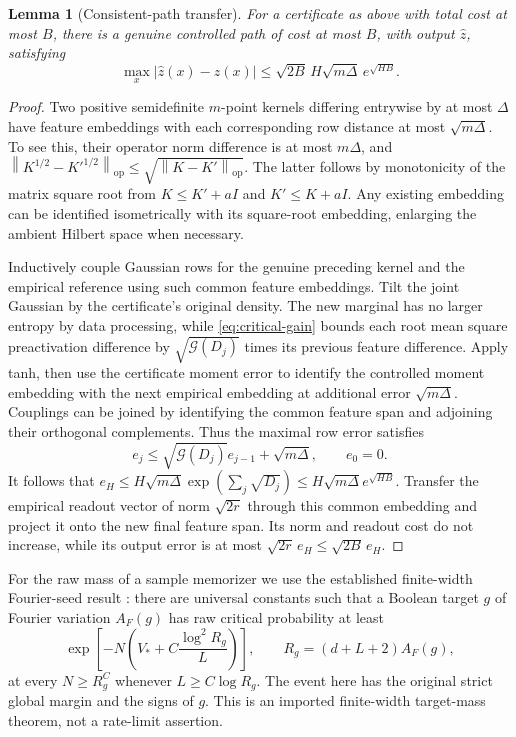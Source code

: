 \documentclass[11pt]{article}
\newtheorem{lemma}[theorem]{Lemma}
\theoremstyle{remark}
\newcommand{\Gain}{\mathcal G}
\newcommand{\norm}[1]{\left\lVert #1\right\rVert}
\begin{document}
\begin{lemma}[Consistent-path transfer]
\label{lem:critical-consistent-transfer}
For a certificate as above with total cost at most $B$, there is
a genuine controlled path of cost at most $B$, with output
$\widehat z$, satisfying
\[
 \max_x|\widehat z(x)-z(x)|
 \le \sqrt{2B}\,H\sqrt{m\Delta}\,e^{\sqrt{HB}}.
\]
\end{lemma}
\begin{proof}
Two positive semidefinite $m$-point kernels differing entrywise
by at most $\Delta$ have feature embeddings with each corresponding
row distance at most $\sqrt{m\Delta}$. To see this, their operator
norm difference is at most $m\Delta$, and
$\norm{K^{1/2}-{K'}^{1/2}}_{\mathrm{op}}
\le\sqrt{\norm{K-K'}_{\mathrm{op}}}$.
The latter follows by monotonicity of the matrix square root from
$K\le K'+aI$ and $K'\le K+aI$. Any existing embedding can be
identified isometrically with its square-root embedding, enlarging
the ambient Hilbert space when necessary.

Inductively couple Gaussian rows for the genuine preceding kernel
and the empirical reference using such common feature embeddings.
Tilt the joint Gaussian by the certificate's original density.
The new marginal has no larger entropy by data processing, while
\eqref{eq:critical-gain} bounds each root mean square preactivation
difference by $\sqrt{\Gain(D_j)}$ times its previous feature
difference. Apply tanh, then use the certificate moment error to
identify the controlled moment embedding with the next empirical
embedding at additional error $\sqrt{m\Delta}$. Couplings can be
joined by identifying the common feature span and adjoining their
orthogonal complements. Thus the maximal row error satisfies
\[
 e_j\le\sqrt{\Gain(D_j)}e_{j-1}+\sqrt{m\Delta},
 \qquad e_0=0.
\]
It follows that
$e_H\le H\sqrt{m\Delta}\exp(\sum_j\sqrt{D_j})
\le H\sqrt{m\Delta}e^{\sqrt{HB}}$.
Transfer the empirical readout vector of norm $\sqrt{2r}$ through
this common embedding and project it onto the new final feature
span. Its norm and readout cost do not increase, while its output
error is at most $\sqrt{2r}\,e_H\le\sqrt{2B}\,e_H$.
\end{proof}

For the raw mass of a sample memorizer we use the established
finite-width Fourier-seed result
\cite[``Finite-width target mass for Fourier seeds'']{critical}:
there are universal constants such that a Boolean target $g$ of
Fourier variation $A_F(g)$ has raw critical probability at least
\[
 \exp\left[-N\left(V_*+C\frac{\log^2 R_g}{L}\right)\right],
 \qquad R_g=(d+L+2)A_F(g),
\]
at every $N\ge R_g^C$ whenever $L\ge C\log R_g$.
The event here has the original strict global margin and the signs
of $g$. This is an imported finite-width target-mass theorem, not
a rate-limit assertion.
\end{document}
